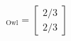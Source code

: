 \documentclass[preview]{standalone}
\begin{document}
\begin{align*}
[\mathbf{x}]_{\text{Owl}} = \begin{bmatrix} 2/3 \\ 2/3 \end{bmatrix}
\end{align*}
\end{document}
